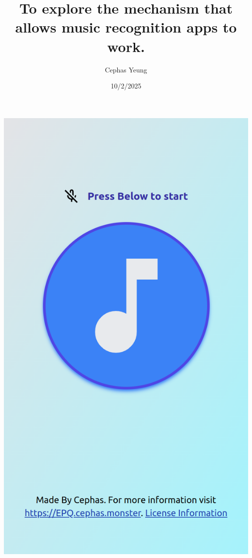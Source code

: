 \documentclass[]{report}
\title{To explore the mechanism that allows music recognition apps to work. }
\author{Cephas Yeung}
\date{10/2/2025}
\begin{document}
\begin{titlepage}
   \centering
   {\Large \bfseries {\runtitle} \bigbreak}
   {\scriptsize \small{\runauthor} \bigbreak}
   \includegraphics[scale=0.3]{screenshots/main_screen.png}\par\vspace{1cm}
\end{titlepage}
\tableofcontents
\newpage

\end{document}

